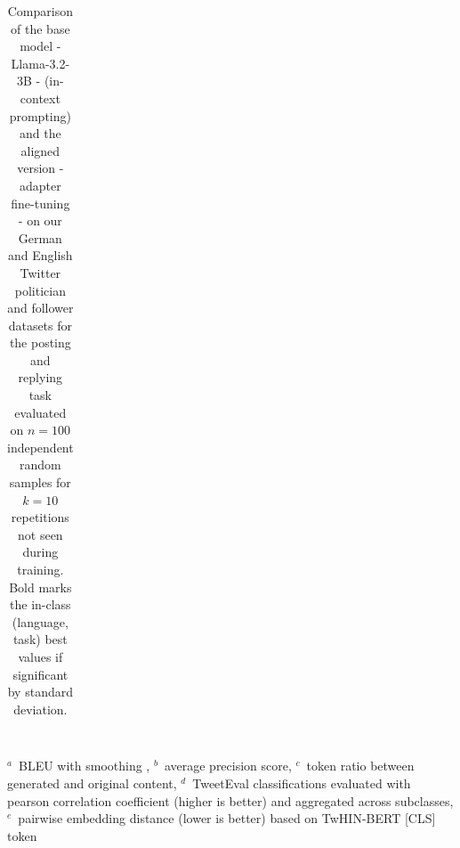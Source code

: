 \begin{table}[ht]
\begin{tabular}{l | rr | rr}
		\bottomrule
	\end{tabular}
	\vspace{0.1cm}
	\\
	\footnotesize{
		$^a$~BLEU with smoothing \citep{lin2004orange},
		$^b$~average precision score, 
		$^c$~token ratio between generated and original content,
		$^d$~TweetEval \citep{barbieri2020tweeteval} classifications evaluated with pearson correlation coefficient (higher is better) and aggregated across subclasses,
		$^e$~pairwise embedding distance (lower is better) based on TwHIN-BERT \citep{zhang2023twhin} [CLS] token
	}
	\caption{
		Comparison of the base model - Llama-3.2-3B \citep{dubey2024llama} - (in-context prompting) and the aligned version - adapter fine-tuning \citep{yu2023low} - on our German and English Twitter politician and follower datasets for the posting and replying task evaluated on $n=100$ independent random samples for $k=10$ repetitions not seen during training. Bold marks the in-class (language, task) best values if significant by standard deviation. 
	}
	\label{tab:results:generative}
\end{table}